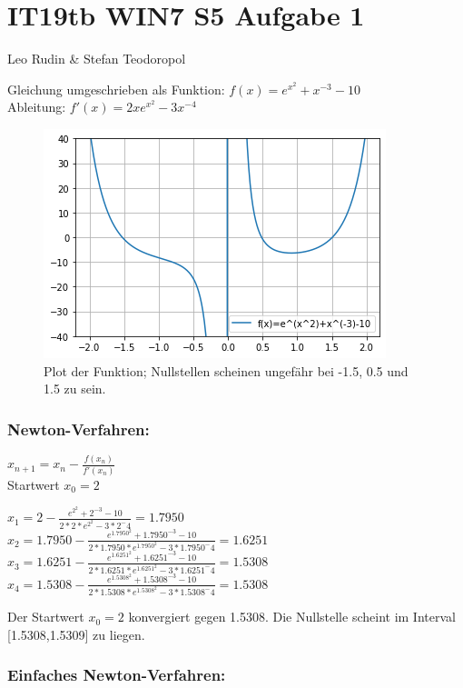 \documentclass{article}
\begin{document}
\section*{IT19tb WIN7 S5 Aufgabe 1}
Leo Rudin \& Stefan Teodoropol

Gleichung umgeschrieben als Funktion: \(f(x) = e^{x^2} + x^{-3} - 10\)\\
Ableitung: \(f'(x) = 2xe^{x^2} - 3x^{-4}\)

\begin{figure}[h!]
\centering
\includegraphics[scale=0.7]{plot_aufg1.png}
\caption{Plot der Funktion; Nullstellen scheinen ungefähr bei -1.5, 0.5 und 1.5 zu sein.}
\label{fig:plot_aufg1b.png}
\end{figure}

\subsubsection*{Newton-Verfahren:}

\(x_{n+1} = x_n - \frac{f(x_n)}{f'(x_n)}\)\\
Startwert \(x_0 = 2\)

\(x_1 = 2 - \frac{e^{2^2} + 2^{-3} - 10}{2*2*e^{2^2} - 3*2^-4} = 1.7950\)\\
\(x_2 = 1.7950 - \frac{e^{1.7950^2} + 1.7950^{-3} - 10}{2*1.7950*e^{1.7950^2} - 3*1.7950^-4} = 1.6251\)\\
\(x_3 = 1.6251 - \frac{e^{1.6251^2} + 1.6251^{-3} - 10}{2*1.6251*e^{1.6251^2} - 3*1.6251^-4} = 1.5308\)\\
\(x_4 = 1.5308 - \frac{e^{1.5308^2} + 1.5308^{-3} - 10}{2*1.5308*e^{1.5308^2} - 3*1.5308^-4} = 1.5308\)

Der Startwert \(x_0 = 2\) konvergiert gegen 1.5308. Die Nullstelle scheint im Interval [1.5308,1.5309] zu liegen.

\newpage
\subsubsection*{Einfaches Newton-Verfahren:}
\end{document}
